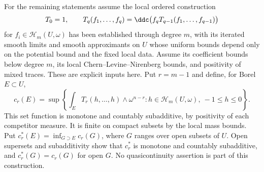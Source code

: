 For the remaining statements assume the local ordered construction
\[
 T_0=1,\qquad
 T_q(f_1,\ldots,f_q)=\ddc\bigl(f_qT_{q-1}(f_1,\ldots,f_{q-1})\bigr)
\]
for $f_i\in\mathcal H_m(U,\omega)$ has been established through degree
$m$, with its iterated smooth limits and smooth approximants on $U$
whose uniform bounds depend only on the potential bound and the fixed
local data. Assume its coefficient bounds
below degree $m$, its local Chern--Levine--Nirenberg bounds, and
positivity of mixed traces. These are explicit inputs here.
Put $r=m-1$ and define, for Borel $E\subset U$,
\[
 c_r(E)=\sup\left\{\int_E T_r(h,\ldots,h)\wedge\omega^{n-r}:
             h\in\mathcal H_m(U,\omega),\ -1\leq h\leq0\right\}.
\]
This set function is monotone and countably subadditive, by positivity
of each competitor measure. It is finite on compact subsets by the
local mass bounds. Put $c_r^*(E)=\inf_{G\supset E}c_r(G)$, where $G$
ranges over open subsets of $U$. Open supersets and subadditivity show that $c_r^*$
is monotone and countably subadditive, and $c_r^*(G)=c_r(G)$ for
open $G$. No quasicontinuity assertion is part of this construction.

